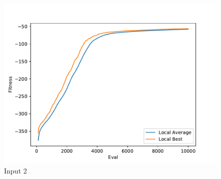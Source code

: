 \documentclass{standalone}
\begin{document}
\begin{figure}[!htb]
	\caption{Input 2}
	\label{fig:graph_2050}
	\includegraphics[width=\textwidth]{../graphs/graphs/2050.pdf}
\end{figure}
\end{document}
